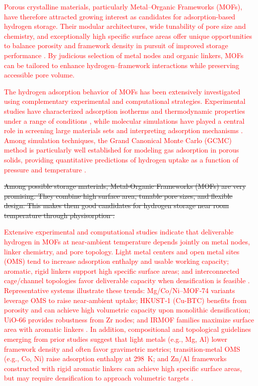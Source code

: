 \documentclass[review]{elsarticle}
\begin{document}
\textcolor{red}{Porous crystalline materials, particularly Metal–Organic Frameworks (MOFs), have therefore attracted growing interest as candidates for adsorption-based hydrogen storage. Their modular architectures, wide tunability of pore size and chemistry, and exceptionally high specific surface areas offer unique opportunities to balance porosity and framework density in pursuit of improved storage performance \cite{dbc22,fgf22,gsi+18,jbpr23,nasm22,zwy+22,fvy+22,Li22}. By judicious selection of metal nodes and organic linkers, MOFs can be tailored to enhance hydrogen–framework interactions while preserving accessible pore volume.}

\textcolor{red}{The hydrogen adsorption behavior of MOFs has been extensively investigated using complementary experimental and computational strategies. Experimental studies have characterized adsorption isotherms and thermodynamic properties under a range of conditions \cite{hwl+23,pam23,smb+23,zzh23,lly+22}, while molecular simulations have played a central role in screening large materials sets and interpreting adsorption mechanisms \cite{ssc23,zzh23}. Among simulation techniques, the Grand Canonical Monte Carlo (GCMC) method is particularly well established for modeling gas adsorption in porous solids, providing quantitative predictions of hydrogen uptake as a function of pressure and temperature \cite{cabria24,zzh23,gc24,cc22}.}

\sout{Among possible storage materials, Metal-Organic Frameworks (MOFs) are very promising. They combine high surface area, tunable pore sizes, and flexible design. This makes them good candidates for hydrogen storage near room temperature through physisorption \cite{gc24}.}

\textcolor{red}{
Extensive experimental and computational studies indicate that deliverable 
hydrogen in MOFs at near‑ambient temperature depends jointly on metal nodes, 
linker chemistry, and pore topology. Light metal centers and open metal sites 
(OMS) tend to increase adsorption enthalpy and usable working capacity; 
aromatic, rigid linkers support high specific surface areas; and interconnected 
cage/channel topologies favor deliverable capacity when densification is 
feasible \cite{smh24,alp+17}. Representative systems illustrate these trends: 
Mg/Co/Ni–MOF‑74 \cite{kjsk+24} variants leverage OMS to raise near‑ambient 
uptake; HKUST‑1 (Cu-BTC) \cite{morb+22} benefits from porosity and can achieve 
high volumetric capacity upon monolithic densification; UiO‑66\cite{ltjw+25} 
provides robustness from Zr nodes; and IRMOF families maximize surface area 
with aromatic linkers \cite{ksaa+23}. In addition, compositional and 
topological guidelines emerging from prior studies suggest that light metals 
(e.g., Mg, Al) lower framework density and often favor gravimetric metrics; 
transition‑metal OMS (e.g., Co, Ni) raise adsorption enthalpy at 298~K; and 
Zn/Al frameworks constructed with rigid aromatic linkers can achieve high 
specific surface areas, but may require densification to approach volumetric 
targets \cite{smh24,alp+17,morb+22}.}
\end{document}
